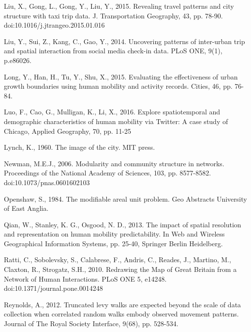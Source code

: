 \documentclass[]{tGIS2e}
\begin{document}
\begin{thebibliography}{9}
Liu, X., Gong, L., Gong, Y., Liu, Y., 2015. Revealing travel patterns and city structure with taxi trip data. J. Transportation Geography, 43, pp. 78-90. doi:10.1016/j.jtrangeo.2015.01.016

Liu, Y., Sui, Z., Kang, C., Gao, Y., 2014. Uncovering patterns of inter-urban trip and spatial interaction from social media check-in data. PLoS ONE, 9(1), p.e86026.

Long, Y., Han, H., Tu, Y., Shu, X., 2015. Evaluating the effectiveness of urban growth boundaries using human mobility and activity records. Cities, 46, pp. 76-84.

Luo, F., Cao, G., Mulligan, K., Li, X., 2016. Explore spatiotemporal and demographic characteristics of human mobility via Twitter: A case study of Chicago, Applied Geography, 70, pp. 11-25


Lynch, K., 1960. The image of the city. MIT press.

Newman, M.E.J., 2006. Modularity and community structure in networks. Proceedings of the National Academy of Sciences, 103, pp. 8577-8582. doi:10.1073/pnas.0601602103

Openshaw, S., 1984. The modifiable areal unit problem. Geo Abstracts University of East Anglia.

Qian, W., Stanley, K. G., Osgood, N. D., 2013. The impact of spatial resolution and representation on human mobility predictability. In Web and Wireless Geographical Information Systems,  pp. 25-40, Springer Berlin Heidelberg.

Ratti, C., Sobolevsky, S., Calabrese, F., Andris, C., Reades, J., Martino, M., Claxton, R., Strogatz, S.H., 2010. Redrawing the Map of Great Britain from a Network of Human Interactions. PLoS ONE 5, e14248. doi:10.1371/journal.pone.0014248

Reynolds, A., 2012. Truncated levy walks are expected beyond the scale of data collection when correlated random walks embody observed movement patterns. Journal of The Royal Society Interface, 9(68), pp. 528-534.


\end{thebibliography}
\end{document}
